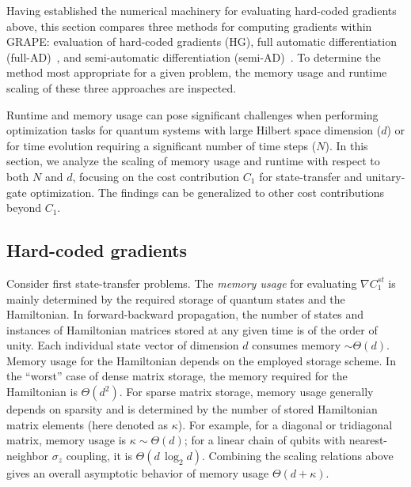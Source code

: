 Having established the numerical machinery for evaluating hard-coded gradients above, this section compares three methods for computing gradients within GRAPE: evaluation of hard-coded gradients (HG), full automatic differentiation (full-AD)~\cite{pacleung2017speedup}, and semi-automatic differentiation (semi-AD)~\cite{semiadgoerz2022quantum}. To determine the method most appropriate for a given problem, the memory usage and runtime scaling of these three approaches are inspected.

Runtime and memory usage can pose significant challenges when performing optimization tasks for quantum systems with large Hilbert space dimension ($d$) or for time evolution requiring a significant number of time steps ($N$). In this section, we analyze the scaling of memory usage and runtime with respect to both $N$ and $d$, focusing on the cost contribution $C_1$ for state-transfer and unitary-gate optimization. The findings can be generalized to other cost contributions beyond $C_1$.

\subsection{Hard-coded gradients}
\label{subsec:scale-hard-coded}

Consider first state-transfer problems. The \textit{memory usage} for evaluating $\nabla C_1^{st}$ is mainly determined by the required storage of quantum states and the Hamiltonian. In forward-backward propagation, the number of states and instances of Hamiltonian matrices stored at any given time is of the order of unity. Each individual state vector of dimension $d$ consumes memory $\sim\Theta(d)$. Memory usage for the Hamiltonian depends on the employed storage scheme. In the ``worst'' case of dense matrix storage, the memory required for the Hamiltonian is $\Theta(d^2)$. For sparse matrix storage, memory usage generally depends on sparsity and is determined by the number of stored Hamiltonian matrix elements (here denoted as $\kappa$).
For example, for a diagonal or tridiagonal matrix, memory usage is $\kappa\sim\Theta(d)$; for a linear chain of qubits with nearest-neighbor $\sigma_z$ coupling, it is $\Theta(d\, \log_2 d)$. Combining the scaling relations above gives an overall asymptotic behavior of memory usage $\Theta(d+\kappa)$.

